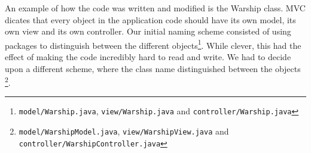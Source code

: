 An example of how the code was written and modified is the Warship class. MVC dicates that every object in the application code should have its own model, its own view and its own controller. Our initial naming scheme consisted of using packages to distinguish between the different objects{\footnote{\texttt{model/Warship.java}, \texttt{view/Warship.java} and \texttt{controller/Warship.java}}}. While clever, this had the effect of making the code incredibly hard to read and write. %
We had to decide upon a different scheme, where the class name distinguished between the objects \footnote{\texttt{model/WarshipModel.java}, \texttt{view/WarshipView.java} and \texttt{controller/WarshipController.java}}.
